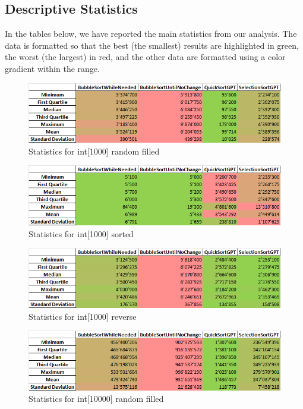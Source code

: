 \documentclass{article}
\begin{document}
\FloatBarrier

\subsection{Descriptive Statistics}
In the tables below, we have reported the main statistics from our analysis. The data is formatted so that the best (the smallest) results are highlighted in green, the worst (the largest) in red, and the other data are formatted using a color gradient within the range.
\begin{figure}[!h]
    \centering
    \includegraphics[width=0.75\linewidth]{int1000rand-stat.png}
    \caption{Statistics for int[1000] random filled}
    \label{fig:int1000rand-stat}
\end{figure}
\begin{figure}[!h]
    \centering
    \includegraphics[width=0.75\linewidth]{int1000sort-stat.png}
    \caption{Statistics for int[1000] sorted}
    \label{fig:int1000sort-stat}
\end{figure}
\begin{figure}[!h]
    \centering
    \includegraphics[width=0.75\linewidth]{int1000rev-stat.png}
    \caption{Statistics for int[1000] reverse}
    \label{fig:int1000rev-stat}
\end{figure}
\begin{figure}[!h]
    \centering
    \includegraphics[width=0.75\linewidth]{int10000rand-stat.png}
    \caption{Statistics for int[10000] random filled}
    \label{fig:int10000rand-stat}
\end{figure}
\end{document}
